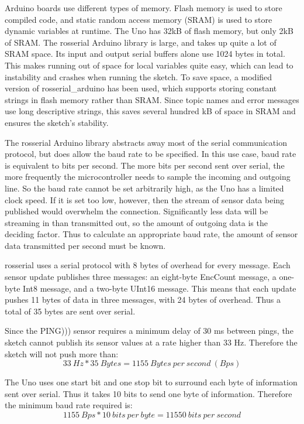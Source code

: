 Arduino boards use different types of memory. Flash memory is used to store compiled code, and static random access memory (SRAM) is used to store dynamic variables at runtime. The Uno has 32kB of flash memory, but only 2kB of SRAM. The rosserial Arduino library is large, and takes up quite a lot of SRAM space. Its input and output serial buffers alone use 1024 bytes in total. This makes running out of space for local variables quite easy, which can lead to instability and crashes when running the sketch. To save space, a modified version of rosserial\_arduino has been used, which supports storing constant strings in flash memory rather than SRAM. Since topic names and error messages use long descriptive strings, this saves several hundred kB of space in SRAM and ensures the sketch's stability.

The rosserial Arduino library abstracts away most of the serial communication protocol, but does allow the baud rate to be specified. In this use case, baud rate is equivalent to bits per second. The more bits per second sent over serial, the more frequently the microcontroller needs to sample the incoming and outgoing line. So the baud rate cannot be set arbitrarily high, as the Uno has a limited clock speed. If it is set too low, however, then the stream of sensor data being published would overwhelm the connection. Significantly less data will be streaming in than transmitted out, so the amount of outgoing data is the deciding factor. Thus to calculate an appropriate baud rate, the amount of sensor data transmitted per second must be known.

rosserial uses a serial protocol with 8 bytes of overhead for every message. Each sensor update publishes three messages: an eight-byte EncCount message, a one-byte Int8 message, and a two-byte UInt16 message. This means that each update pushes 11 bytes of data in three messages, with 24 bytes of overhead. Thus a total of 35 bytes are sent over serial.

Since the PING))) sensor requires a minimum delay of 30 ms between pings, the sketch cannot publish its sensor values at a rate higher than 33 Hz. Therefore the sketch will not push more than:
\[33\ Hz * 35\ Bytes = 1155\ Bytes\ per\ second\ (Bps)\]

The Uno uses one start bit and one stop bit to surround each byte of information sent over serial. Thus it takes 10 bits to send one byte of information. Therefore the minimum baud rate required is:
\[1155\ Bps * 10\ bits\ per\ byte = 11550\ bits\ per\ second\]

